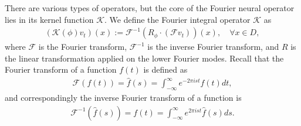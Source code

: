 There are various types of operators, but the core of the Fourier neural operator lies in its kernel function $\mathcal{K}$.
We define the Fourier integral operator $\mathcal{K}$ as 
\begin{align}
    \left( \mathcal{K}(\phi)v_t \right) (x) := \mathcal{F}^{-1} \left( R_{\phi} \cdot (\mathcal{F}v_t ) \right)(x), \quad \forall x \in D,
\end{align}
where $\mathcal{F}$ is the Fourier transform, $\mathcal{F}^{-1}$ is the inverse Fourier transform, and $R$ is the linear transformation applied on the lower Fourier modes. 
Recall that the Fourier transform of a function $f(t)$ is defined as
\begin{align}
    \mathcal{F} (f(t)) = \hat{f}(s) = \int_{-\infty}^{\infty} e^{ -2 \pi ist} f(t) dt,
\end{align}
and correspondingly the inverse Fourier transform of a function is
\begin{align*}
    \mathcal{F}^{-1} (\hat{f}(s)) = f(t) = \int_{-\infty}^{\infty}  e^{2 \pi ist} \hat{f}(s) ds.
\end{align*}


